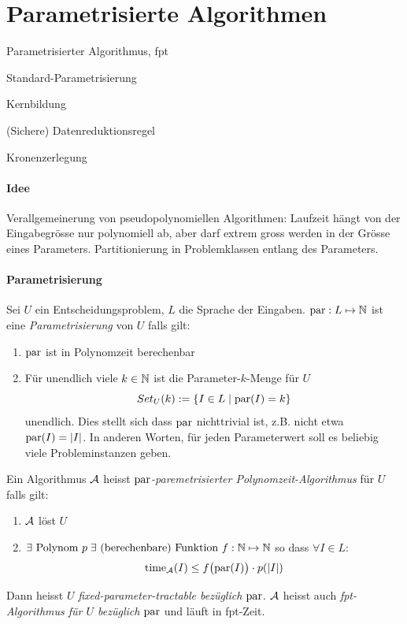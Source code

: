\section{Parametrisierte Algorithmen}

\begin{takeaway}
    \item Parametrisierter Algorithmus, fpt
    \item Standard-Parametrisierung
    \item Kernbildung
    \item (Sichere) Datenreduktionsregel
    \item Kronenzerlegung
\end{takeaway}

\paragraph{Idee}
Verallgemeinerung von pseudopolynomiellen Algorithmen:
Laufzeit hängt von der Eingabegrösse nur polynomiell ab, aber darf extrem gross werden in der Grösse eines Parameters.
Partitionierung in Problemklassen entlang des Parameters.

\paragraph{Parametrisierung}
Sei $U$ ein Entscheidungsproblem, $L$ die Sprache der Eingaben.
$\text{par}: L \mapsto \mathbb{N}$ ist eine \emph{Parametrisierung} von $U$ falls gilt:
\begin{enumerate}[label=(\roman*)]
    \item $\text{par}$ ist in Polynomzeit berechenbar
    \item Für unendlich viele $k \in \mathbb{N}$ ist die Parameter-$k$-Menge für $U$
    $$ Set_U(k) := \{ I \in L \; | \; \text{par}(I) = k \} $$ unendlich.
    Dies stellt sich dass $\text{par}$ nichttrivial ist, z.B. nicht etwa $\text{par}(I) = |I|$.
    In anderen Worten, für jeden Parameterwert soll es beliebig viele Probleminstanzen geben.
\end{enumerate}
Ein Algorithmus $\mathcal{A}$ heisst \emph{$\text{par}$-paremetrisierter Polynomzeit-Algorithmus} für $U$ falls gilt:
\begin{enumerate}[label=(\roman*)]
    \item $\mathcal{A}$ löst $U$
    \item $ \exists \text{ Polynom } p \; \exists \text{ (berechenbare) Funktion } f : \mathbb{N} \mapsto \mathbb{N}$
    so dass $\forall I \in L$:
    $$\text{time}_{\mathcal{A}}(I) \leq f \big( \text{par}(I) \big) \cdot p(|I|) $$
\end{enumerate}
Dann heisst $U$ \emph{fixed-parameter-tractable bezüglich $\text{par}$}.
$\mathcal{A}$ heisst auch \emph{fpt-Algorithmus für $U$ bezüglich $\text{par}$} und läuft in fpt-Zeit.

